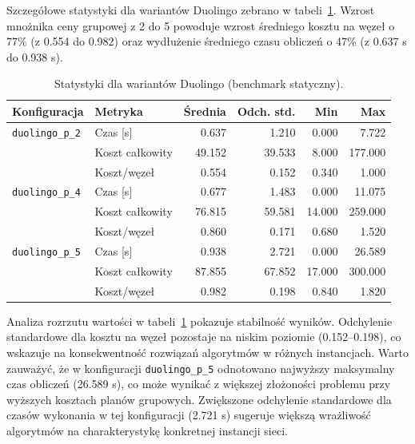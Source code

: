 Szczegółowe statystyki dla wariantów Duolingo zebrano w tabeli~\ref{tab:ext-duolingo-stats}. Wzrost mnożnika ceny grupowej z 2 do 5 powoduje wzrost średniego kosztu na węzeł o 77\% (z 0.554 do 0.982) oraz wydłużenie średniego czasu obliczeń o 47\% (z 0.637 s do 0.938 s).

\begin{table}[H]
  \centering
  \caption{Statystyki dla wariantów Duolingo (benchmark statyczny).}
  \label{tab:ext-duolingo-stats}
  \begin{tabular}{llrrrr}
    \toprule
    \textbf{Konfiguracja}   & \textbf{Metryka} & \textbf{Średnia} & \textbf{Odch. std.} & \textbf{Min} & \textbf{Max} \\
    \midrule
    \texttt{duolingo\_p\_2} & Czas [s]         & 0.637            & 1.210               & 0.000        & 7.722        \\
                            & Koszt całkowity  & 49.152           & 39.533              & 8.000        & 177.000      \\
                            & Koszt/węzeł      & 0.554            & 0.152               & 0.340        & 1.000        \\
    \midrule
    \texttt{duolingo\_p\_4} & Czas [s]         & 0.677            & 1.483               & 0.000        & 11.075       \\
                            & Koszt całkowity  & 76.815           & 59.581              & 14.000       & 259.000      \\
                            & Koszt/węzeł      & 0.860            & 0.171               & 0.680        & 1.520        \\
    \midrule
    \texttt{duolingo\_p\_5} & Czas [s]         & 0.938            & 2.721               & 0.000        & 26.589       \\
                            & Koszt całkowity  & 87.855           & 67.852              & 17.000       & 300.000      \\
                            & Koszt/węzeł      & 0.982            & 0.198               & 0.840        & 1.820        \\
    \bottomrule
  \end{tabular}
\end{table}



Analiza rozrzutu wartości w tabeli~\ref{tab:ext-duolingo-stats} pokazuje stabilność wyników. Odchylenie standardowe dla kosztu na węzeł pozostaje na niskim poziomie (0.152--0.198), co wskazuje na konsekwentność rozwiązań algorytmów w różnych instancjach. Warto zauważyć, że w konfiguracji \texttt{duolingo\_p\_5} odnotowano najwyższy maksymalny czas obliczeń (26.589 s), co może wynikać z większej złożoności problemu przy wyższych kosztach planów grupowych. Zwiększone odchylenie standardowe dla czasów wykonania w tej konfiguracji (2.721 s) sugeruje większą wrażliwość algorytmów na charakterystykę konkretnej instancji sieci.

